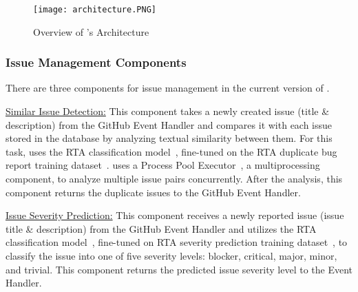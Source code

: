 \begin{figure}[t]
    \centering
    \texttt{[image: architecture.PNG]} 
    \caption{Overview of \toolname's Architecture}
    \label{fig:architecture}
\end{figure}

\subsubsection{Issue Management Components}
There are three components for issue management in the current version of \toolname.

\underline{Similar Issue Detection:} This component takes a newly created issue (title \& description) from the GitHub Event Handler and compares it with each issue stored in the database by analyzing textual similarity between them. For this task, \toolname uses the RTA classification model~\cite{fang2023representthemall}, fine-tuned on the RTA duplicate bug report training dataset~\cite{representThemAllDataset}. \toolname uses a Process Pool Executor~\cite{processPool}, a multiprocessing component, to analyze multiple issue pairs concurrently. After the analysis, this component returns the duplicate issues to the GitHub Event Handler.

\underline{Issue Severity Prediction:} This component receives a newly reported issue (issue title \& description) from the GitHub Event Handler and utilizes the RTA classification model~\cite{fang2023representthemall}, fine-tuned on RTA severity prediction training dataset~\cite{representThemAllDataset}, to classify the issue into one of five severity levels: blocker, critical, major, minor, and trivial. This component returns the predicted issue severity level to the Event Handler.

